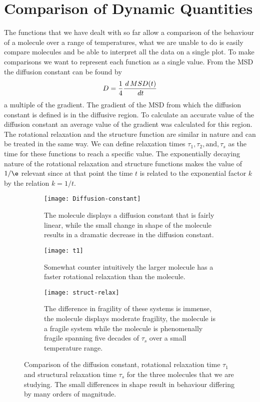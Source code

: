 \section{Comparison of Dynamic Quantities}

The functions that we have dealt with so far allow a comparison of the behaviour of a molecule over a range of temperatures, what we are unable to do is easily compare molecules and be able to interpret all the data on a single plot. To make comparisons we want to represent each function as a single value. From the MSD the diffusion constant can be found by
\begin{equation}
    D = \frac{1}{4}\frac{\,d \,MSD(t)}{\,d t}
\end{equation} 
a multiple of the gradient. The gradient of the MSD from which the diffusion constant is defined is in the diffusive region. To calculate an accurate value of the diffusion constant an average value of the gradient was calculated for this region. The rotational relaxation and the structure function are similar in nature and can be treated in the same way. We can define relaxation times $\tau_1,\tau_2,\text{and},\tau_s$ as the time for these functions to reach a specific value. The exponentially decaying nature of the rotational relaxation and structure functions makes the value of $1/\e$ relevant since at that point the time $t$ is related to the exponential factor $k$ by the relation $k=1/t$.

\begin{figure}
    \centering
    \begin{subfigure}{0.6\linewidth}
        \texttt{[image: Diffusion-constant]}
        \caption{The \sone molecule displays a diffusion constant that is fairly linear, while the small change in shape of the \scon molecule results in a dramatic decrease in the diffusion constant.}
        \label{fig:diffusion constant}
    \end{subfigure}
    \begin{subfigure}{0.6\linewidth}
        \texttt{[image: t1]}
        \caption{Somewhat counter intuitively the larger \tri molecule has a faster rotational relaxation than the \scon molecule.}
        \label{fig:tau1}
    \end{subfigure}
    \begin{subfigure}{0.6\textwidth}
        \texttt{[image: struct-relax]}
        \caption{The difference in fragility of these systems is immense, the \sone molecule displays moderate fragility, the \tri molecule is a fragile system while the \scon molecule is phenomenally fragile spanning five decades of $\tau_s$ over a small temperature range.}
        \label{fig:struct relax}
    \end{subfigure}
    \caption{Comparison of the diffusion constant, rotational relaxation time $\tau_1$ and structural relaxation time $\tau_s$ for the three molecules that we are studying. The small differences in shape result in behaviour differing by many orders of magnitude.}

    \label{fig:dynamic comparison}
\end{figure}

